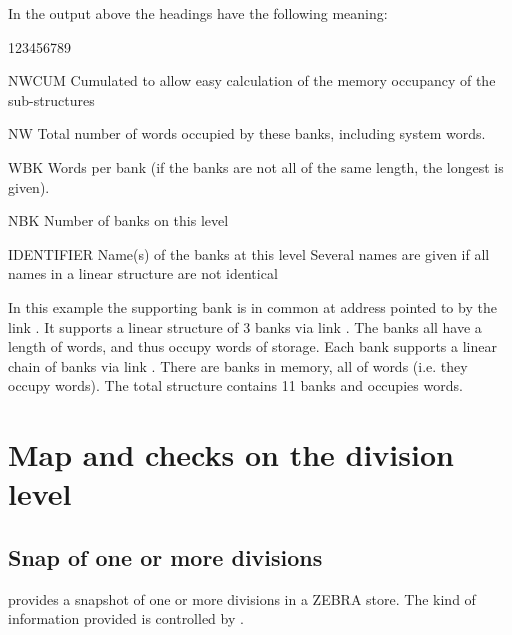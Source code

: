 In the output above the headings have the following meaning:
\begin{DLtt}{123456789}
\item[NWCUM]Cumulated  to allow easy calculation of
the memory occupancy of the sub-structures
\item[NW]Total number of words occupied by these  banks,
including system words.
\item[WBK]Words per bank (if the  banks are not all
of the same length, the longest is given).
\item[NBK]Number of banks on this level
\item[IDENTIFIER]Name(s) of the banks at this level
\newline Several names are given if all names
in a linear structure are not identical
\end{DLtt}

In this example
the supporting bank  is in common \Lit{//} at address
 pointed to by the link .
It supports a linear structure of 3  banks via link .
The  banks all
have a length of  words, and thus occupy  words of storage.
Each  bank supports a linear chain of
 banks via link .
There are   banks in memory, all of  words
(i.e. they occupy  words).
The total structure contains 11 banks and occupies  words.

\newpage

\section{Map and checks on the division level}
\subsection{Snap of one or more divisions}


\Action
{} provides a snapshot of one or more divisions in a ZEBRA
store. The kind of information provided is controlled by .

